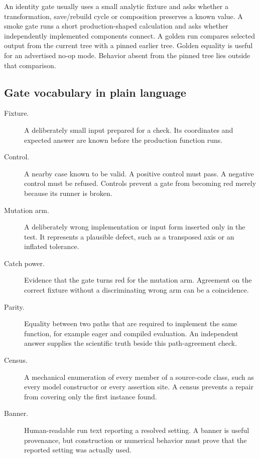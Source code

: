 \documentclass[10pt,aps,prd,twocolumn,nofootinbib]{revtex4-2}
\begin{document}
An identity gate usually uses a small analytic fixture and asks whether a
transformation, save/rebuild cycle or composition preserves a known value.
A smoke gate runs a short production-shaped calculation and asks whether
independently implemented components connect.  A golden run compares selected
output from the current tree with a pinned earlier tree.  Golden equality is
useful for an advertised no-op mode.  Behavior absent from the pinned tree
lies outside that comparison.

\subsection{Gate vocabulary in plain language}

\begin{description}
  \item[Fixture.] A deliberately small input prepared for a check.  Its
  coordinates and expected answer are known before the production function
  runs.

  \item[Control.] A nearby case known to be valid.  A positive control must
  pass.  A negative control must be refused.  Controls prevent a gate from
  becoming red merely because its runner is broken.

  \item[Mutation arm.] A deliberately wrong implementation or input form
  inserted only in the test.  It represents a plausible defect, such as a
  transposed axis or an inflated tolerance.

  \item[Catch power.] Evidence that the gate turns red for the mutation
  arm.  Agreement on the correct fixture without a discriminating wrong arm
  can be a coincidence.

  \item[Parity.] Equality between two paths that are required to implement
  the same function, for example eager and compiled evaluation.  An
  independent answer supplies the scientific truth beside this path-agreement
  check.

  \item[Census.] A mechanical enumeration of every member of a source-code
  class, such as every model constructor or every assertion site.  A census
  prevents a repair from covering only the first instance found.

  \item[Banner.] Human-readable run text reporting a resolved setting.  A
  banner is useful provenance, but construction or numerical behavior must
  prove that the reported setting was actually used.


\end{description}
\end{document}
